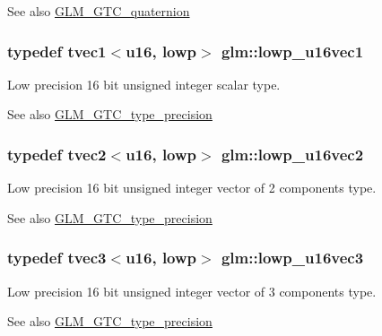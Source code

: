\begin{DoxySeeAlso}{See also}
\hyperlink{group__gtc__quaternion}{G\+L\+M\+\_\+\+G\+T\+C\+\_\+quaternion} 
\end{DoxySeeAlso}
\hypertarget{namespaceglm_aa045c5f3ae5b7560ab32428243eb2ba0}{}
\subsubsection[{lowp\+\_\+u16vec1}]{\setlength{\rightskip}{0pt plus 5cm}typedef tvec1$<${\bf u16}, lowp$>$ {\bf glm\+::lowp\+\_\+u16vec1}}\label{namespaceglm_aa045c5f3ae5b7560ab32428243eb2ba0}
Low precision 16 bit unsigned integer scalar type. \begin{DoxySeeAlso}{See also}
\hyperlink{group__gtc__type__precision}{G\+L\+M\+\_\+\+G\+T\+C\+\_\+type\+\_\+precision} 
\end{DoxySeeAlso}
\hypertarget{namespaceglm_a9924585d295ea61cf0effe9c5e42312f}{}
\subsubsection[{lowp\+\_\+u16vec2}]{\setlength{\rightskip}{0pt plus 5cm}typedef tvec2$<${\bf u16}, lowp$>$ {\bf glm\+::lowp\+\_\+u16vec2}}\label{namespaceglm_a9924585d295ea61cf0effe9c5e42312f}
Low precision 16 bit unsigned integer vector of 2 components type. \begin{DoxySeeAlso}{See also}
\hyperlink{group__gtc__type__precision}{G\+L\+M\+\_\+\+G\+T\+C\+\_\+type\+\_\+precision} 
\end{DoxySeeAlso}
\hypertarget{namespaceglm_aa4c9f5644c12494b9c03591f73f687c8}{}
\subsubsection[{lowp\+\_\+u16vec3}]{\setlength{\rightskip}{0pt plus 5cm}typedef tvec3$<${\bf u16}, lowp$>$ {\bf glm\+::lowp\+\_\+u16vec3}}\label{namespaceglm_aa4c9f5644c12494b9c03591f73f687c8}
Low precision 16 bit unsigned integer vector of 3 components type. \begin{DoxySeeAlso}{See also}
\hyperlink{group__gtc__type__precision}{G\+L\+M\+\_\+\+G\+T\+C\+\_\+type\+\_\+precision} 
\end{DoxySeeAlso}
\hypertarget{namespaceglm_a503d858a175ae9b4c92008ec12bfb3eb}{}
